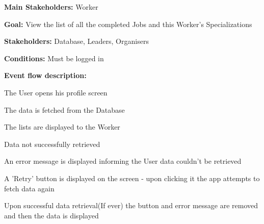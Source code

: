 				\noindent {}
				\begin{packed_item}
					\item \textbf{Main Stakeholders:} Worker
					\item \textbf{Goal:} View the list of all the completed Jobs and this Worker's Specializations
					\item \textbf{Stakeholders: } Database, Leaders, Organisers
					\item \textbf{Conditions: } Must be logged in
					\item \textbf{Event flow description: }
					\begin{packed_enum}
						\item The User opens his profile screen
						\item The data is fetched from the Database
						\item The lists are displayed to the Worker
					\end{packed_enum}
					
					\begin{packed_item}
						\item[1.a] Data not successfully retrieved
						\item[] \begin{packed_enum}
							\item An error message is displayed informing the User data couldn't be retrieved
							\item A 'Retry' button is displayed on the screen - upon clicking it the app attempts to fetch data again
							\item Upon successful data retrieval(If ever) the button and error message are removed and then the data is displayed
						\end{packed_enum}
					\end{packed_item}
					
				\end{packed_item}
			
